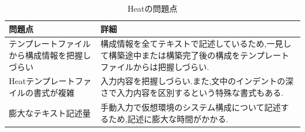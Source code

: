 \documentclass[mingoth]{kut-paper}		%
\begin{document}
	\begin{table}[H]
		\begin{center}
			\caption{Heatの問題点}
			\label{table:2}
			\begin{tabular}{|p{5cm}|p{7cm}|}\hline
				問題点 & 詳細\\ \hline \hline
				テンプレートファイルから構成情報を把握しづらい & 構成情報を全てテキストで記述しているため,一見して構築途中または構築完了後の構成をテンプレートファイルからは把握しづらい.\\ \hline
				Heatテンプレートファイルの書式が複雑 & 入力内容を把握しづらい.また,文中のインデントの深さで入力内容を区別するという特殊な書式もある.\\ \hline
				膨大なテキスト記述量 & 手動入力で仮想環境のシステム構成について記述するため,記述に膨大な時間がかかる.\\ \hline
			\end{tabular}
		\end{center}
	\end{table}
\end{document}
